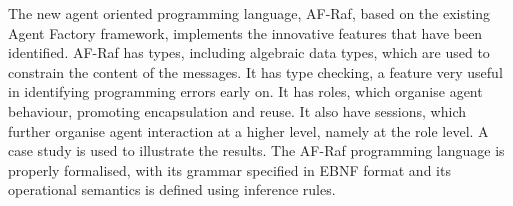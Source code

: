 \documentclass[a4paper,12pt,oneside,fleqn]{book} %
\begin{document}
The new agent oriented programming language, AF-Raf, based on the existing
Agent Factory framework, implements the innovative features that have been
identified. AF-Raf has types, including algebraic data types, which are
used to constrain the content of the messages. It has type checking, a
feature very useful in identifying programming errors early on. It has
roles, which organise agent behaviour, promoting encapsulation and reuse.
It also have sessions, which further organise agent interaction at a higher
level, namely at the role level. A case study is used to illustrate the
results.  The AF-Raf programming language is properly formalised, with its
grammar specified in EBNF format and its operational semantics is defined
using inference rules.



\appendix
\end{document}
